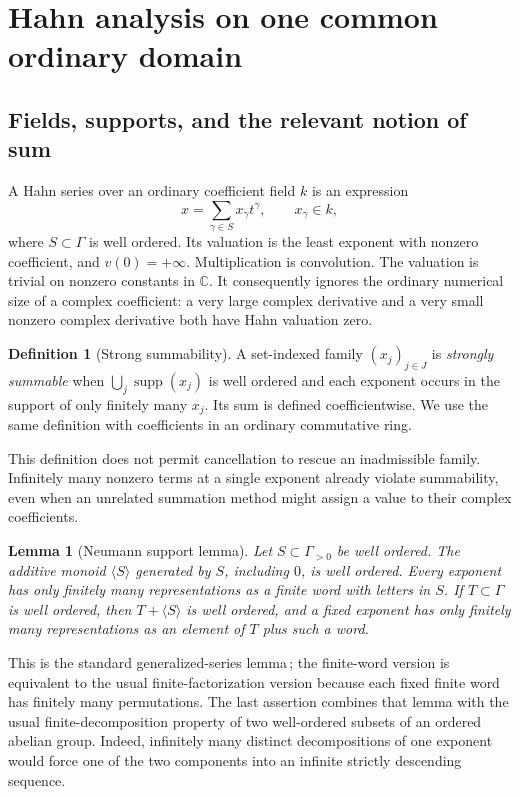 \documentclass[11pt,a4paper]{article}
\numberwithin{equation}{section}
\newtheorem{lemma}[theorem]{Lemma}
\theoremstyle{definition}
\newtheorem{definition}[theorem]{Definition}
\theoremstyle{remark}
\newcommand{\C}{\mathbb C}
\newcommand{\supp}{\operatorname{supp}}
\newcommand{\Neu}[1]{\langle #1\rangle}
\begin{document}
\section{Hahn analysis on one common ordinary domain}
\label{sec:hahn}

\subsection{Fields, supports, and the relevant notion of sum}

A Hahn series over an ordinary coefficient field $k$ is an expression
\[
 x=\sum_{\gamma\in S}x_\gamma t^\gamma,
 \qquad x_\gamma\in k,
\]
where $S\subset\Gamma$ is well ordered.  Its valuation is the least exponent
with nonzero coefficient, and $v(0)=+\infty$.  Multiplication is convolution.
The valuation is trivial on nonzero constants in $\C$.  It consequently
ignores the ordinary numerical size of a complex coefficient: a very large
complex derivative and a very small nonzero complex derivative both have
Hahn valuation zero.

\begin{definition}[Strong summability]
A set-indexed family $(x_j)_{j\in J}$ is \emph{strongly summable} when
$\bigcup_j\supp(x_j)$ is well ordered and each exponent occurs in the support
of only finitely many $x_j$.  Its sum is defined coefficientwise.  We use the
same definition with coefficients in an ordinary commutative ring.
\end{definition}

This definition does not permit cancellation to rescue an inadmissible
family.  Infinitely many nonzero terms at a single exponent already violate
summability, even when an unrelated summation method might assign a value to
their complex coefficients.

\begin{lemma}[Neumann support lemma]\label{lem:neumann}
Let $S\subset\Gamma_{>0}$ be well ordered.  The additive monoid
$\Neu S$ generated by $S$, including $0$, is well ordered.  Every exponent
has only finitely many representations as a finite word with letters in
$S$.  If $T\subset\Gamma$ is well ordered, then $T+\Neu S$ is well ordered,
and a fixed exponent has only finitely many representations as an element
of $T$ plus such a word.
\end{lemma}

This is the standard generalized-series lemma\,\cite{Neumann}; the
finite-word version is equivalent to the usual finite-factorization version
because each fixed finite word has finitely many permutations.  The last
assertion combines that lemma with the usual finite-decomposition property
of two well-ordered subsets of an ordered abelian group.  Indeed, infinitely
many distinct decompositions of one exponent would force one of the two
components into an infinite strictly descending sequence.
\end{document}
